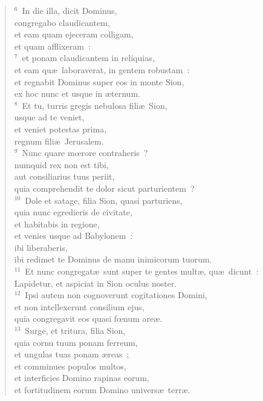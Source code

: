 \begin{verse}${}^{6}$~In die illa, dicit Dominus,\\ congregabo claudicantem,\\ et eam quam ejeceram colligam,\\ et quam afflixeram~:\\
${}^{7}$~et ponam claudicantem in reliquias,\\ et eam qu\ae\ laboraverat, in gentem robustam~:\\ et regnabit Dominus super eos in monte Sion,\\ ex hoc nunc et usque in \ae ternum.\\
${}^{8}$~Et tu, turris gregis nebulosa fili\ae\ Sion,\\ usque ad te veniet,\\ et veniet potestas prima,\\ regnum fili\ae\ Jerusalem.\\
${}^{9}$~Nunc quare mœrore contraheris~?\\ numquid rex non est tibi,\\ aut consiliarius tuus periit,\\ quia comprehendit te dolor sicut parturientem~?\\
${}^{10}$~Dole et satage, filia Sion, quasi parturiens,\\ quia nunc egredieris de civitate,\\ et habitabis in regione,\\ et venies usque ad Babylonem~:\\ ibi liberaberis,\\ ibi redimet te Dominus de manu inimicorum tuorum.\\
${}^{11}$~Et nunc congregat\ae\ sunt super te gentes mult\ae , qu\ae\ dicunt~:\\ Lapidetur, et aspiciat in Sion oculus noster.\\
${}^{12}$~Ipsi autem non cognoverunt cogitationes Domini,\\ et non intellexerunt consilium ejus,\\ quia congregavit eos quasi fœnum are\ae .\\
${}^{13}$~Surge, et tritura, filia Sion,\\ quia cornu tuum ponam ferreum,\\ et ungulas tuas ponam \ae reas~;\\ et comminues populos multos,\\ et interficies Domino rapinas eorum,\\ et fortitudinem eorum Domino univers\ae\ terr\ae .\end{verse}


